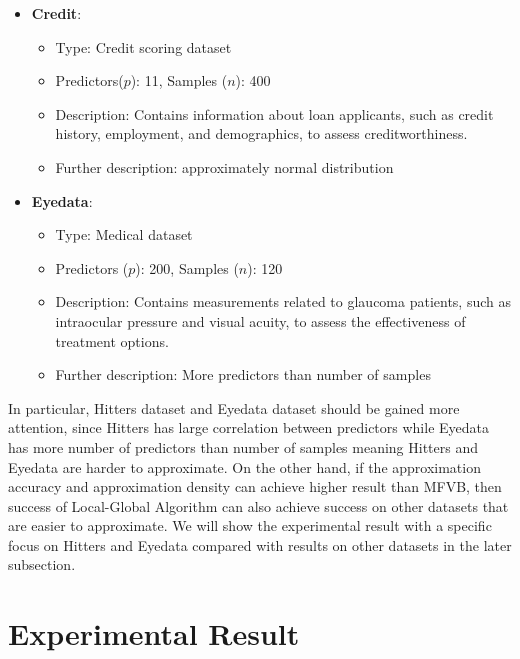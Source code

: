 \begin{itemize}
	\item \textbf{Credit}:
	\begin{itemize}
		\item Type: Credit scoring dataset
		\item Predictors($p$): 11, Samples ($n$): 400
		\item Description: Contains information about loan applicants, such as credit history, employment, and demographics, to assess creditworthiness.
		\item Further description: approximately normal distribution
	\end{itemize}
	
	\item \textbf{Eyedata}:
	\begin{itemize}
		\item Type: Medical dataset
		\item Predictors ($p$): 200, Samples ($n$): 120
		\item Description: Contains measurements related to glaucoma patients, such as intraocular pressure and visual acuity, to assess the effectiveness of treatment options.
		\item Further description: More predictors than number of samples
	\end{itemize}
\end{itemize}

In particular, Hitters dataset and Eyedata dataset should be gained more attention, since Hitters has large correlation between predictors while Eyedata has more number of predictors than number of samples meaning Hitters and Eyedata are harder to approximate. On the other hand, if the approximation accuracy and approximation density can achieve higher result than MFVB, then success of Local-Global Algorithm can also achieve success on other datasets that are easier to approximate. We will show the experimental result with a specific focus on Hitters and Eyedata compared with results on other datasets in the later subsection.

\section{Experimental Result}

